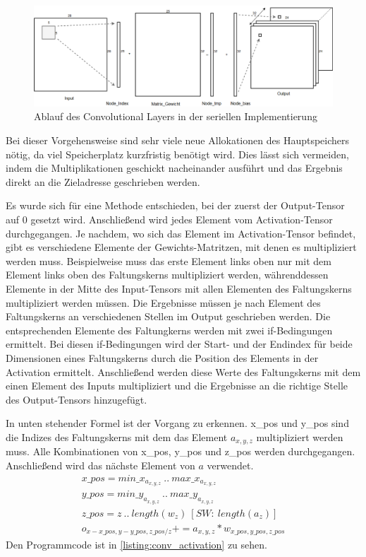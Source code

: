 \documentclass[../main.tex]{subfiles}
\begin{document}
\begin{figure}[!htbp]
	\centering
	\includegraphics[width=\textwidth]{../images/Benz/Conv_Layer_Seriel.png} %
	\caption{Ablauf des Convolutional Layers in der seriellen Implementierung} 
	\label{fig:conv_layer_seriell}
\end{figure}


Bei dieser Vorgehensweise sind sehr viele neue Allokationen des Hauptspeichers nötig, da viel Speicherplatz kurzfristig benötigt wird. Dies lässt sich vermeiden, indem die Multiplikationen geschickt nacheinander ausführt und das Ergebnis direkt an die Zieladresse geschrieben werden. 

Es wurde sich für eine Methode entschieden, bei der zuerst der Output-Tensor auf 0 gesetzt wird. Anschließend wird jedes Element vom Activation-Tensor durchgegangen. Je nachdem, wo sich das Element im Activation-Tensor befindet, gibt es verschiedene Elemente der Gewichts-Matritzen, mit denen es multipliziert werden muss. Beispielweise muss das erste Element links oben nur mit dem Element links oben des Faltungskerns multipliziert werden, währenddessen Elemente in der Mitte des Input-Tensors mit allen Elementen des Faltungskerns multipliziert werden müssen. Die Ergebnisse müssen je nach Element des Faltungskerns an verschiedenen Stellen im Output geschrieben werden.
Die entsprechenden Elemente des Faltungkerns werden mit zwei if-Bedingungen ermittelt. Bei diesen if-Bedingungen wird der Start- und der Endindex für beide Dimensionen eines Faltungskerns durch die Position des Elements in der Activation ermittelt. Anschließend werden diese Werte des Faltungskerns mit dem einen Element des Inputs multipliziert und die Ergebnisse an die richtige Stelle des Output-Tensors hinzugefügt.

In unten stehender Formel ist der Vorgang zu erkennen. x\_pos und y\_pos sind die Indizes des Faltungskerns mit dem das Element \(a_{x,y,z}\) multipliziert werden muss. Alle Kombinationen von x\_pos, y\_pos und z\_pos werden durchgegangen. Anschließend wird das nächste Element von \(a\) verwendet.
\begin{equation}
\begin{split}
x\_pos = {min\_x_{a_{x,y,z}}\ ..\ max\_x_{a_{x,y,z}}}\\
y\_pos = {min\_y_{a_{x,y,z}}\ ..\ max\_y_{a_{x,y,z}}}\\
z\_pos = {z\ ..\ length(w_{z})\ [SW:\ length(a_{z})]}\\
o_{x-x\_pos,y-y\_pos,z\_pos/z} += a_{x,y,z}*w_{x\_pos,y\_pos,z\_pos}
\end{split}
\end{equation}
Den Programmcode ist in \ref{listing:conv_activation} zu sehen.
\end{document}
